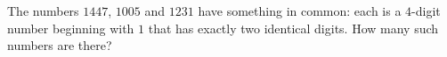 The numbers $1447$, $1005$ and $1231$ have something in common: each is a $4$-digit number beginning with $1$ that has exactly two identical digits. How many such numbers are there?
